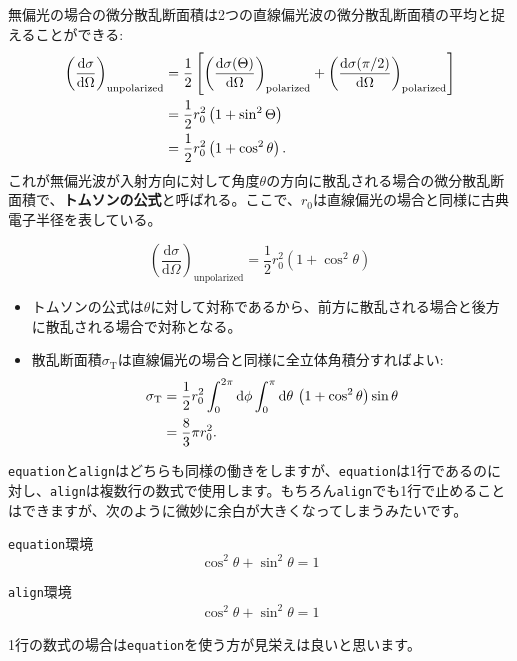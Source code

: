 \documentclass[a4paper,papersize,uplatex,dvipdfmx,10pt]{jsarticle}
\begin{document}
\begin{tcolorbox}[title=数式を用いた文章構成の例]
  無偏光の場合の微分散乱断面積は2つの直線偏光波の微分散乱断面積の平均と捉えることができる:
  \begin{align}
    \left( \frac{\mathrm{d}\sigma}{\mathrm{d}\Omega} \right)_{\mathrm{unpolarized}} &=
    \frac{1}{2}\left[ \left( \frac{\mathrm{d}\sigma(\Theta)}{\mathrm{d}\Omega} \right)_{\mathrm{polarized}} + \left( \frac{\mathrm{d}\sigma(\pi / 2)}{\mathrm{d}\Omega} \right)_{\mathrm{polarized}} \right]\notag\\
    &= \frac{1}{2}r_{0}^{2}\left( 1+\sin^{2}\Theta \right)\notag\\
    &= \frac{1}{2}r_{0}^{2}\left( 1+\cos^{2}\theta \right).
  \end{align}
  これが無偏光波が入射方向に対して角度$\theta$の方向に散乱される場合の微分散乱断面積で、\textbf{トムソンの公式}と呼ばれる。ここで、$r_{0}$は直線偏光の場合と同様に古典電子半径を表している。
  \begin{tcolorbox}[title=Thomson formula]
    \begin{equation*}
      \left( \frac{\mathrm{d}\sigma}{\mathrm{d}\Omega} \right)_{\mathrm{unpolarized}} = \frac{1}{2}r_{0}^{2}\left( 1+\cos^{2}\theta \right)
    \end{equation*}
  \end{tcolorbox}
  \begin{itemize}
    \item トムソンの公式は$\theta$に対して対称であるから、前方に散乱される場合と後方に散乱される場合で対称となる。
    \item 散乱断面積$\sigma_{\mathrm{T}}$は直線偏光の場合と同様に全立体角積分すればよい:
    \begin{align}
      \sigma_{\mathrm{T}} &= \frac{1}{2}r_{0}^{2} \int^{2\pi}_{0}\mathrm{d}\phi \int^{\pi}_{0}\mathrm{d}\theta\, \left( 1+\cos^{2}\theta \right) \sin\theta\notag\\
      &= \frac{8}{3}\pi r_{0}^{2}.\label{eq:sanran_unpol}
    \end{align}
  \end{itemize}
\end{tcolorbox}

\texttt{equation}と\texttt{align}はどちらも同様の働きをしますが、\texttt{equation}は1行であるのに対し、\texttt{align}は複数行の数式で使用します。もちろん\texttt{align}でも1行で止めることはできますが、次のように微妙に余白が大きくなってしまうみたいです。
\begin{itembox}[l]{\texttt{equation}環境}
  \begin{equation*}
    \cos^{2}{\theta} + \sin^{2}{\theta} = 1
  \end{equation*}
\end{itembox}
\begin{itembox}[l]{\texttt{align}環境}
  \begin{align*}
    \cos^{2}{\theta} + \sin^{2}{\theta} = 1
  \end{align*}
\end{itembox}
1行の数式の場合は\texttt{equation}を使う方が見栄えは良いと思います。
\end{document}
